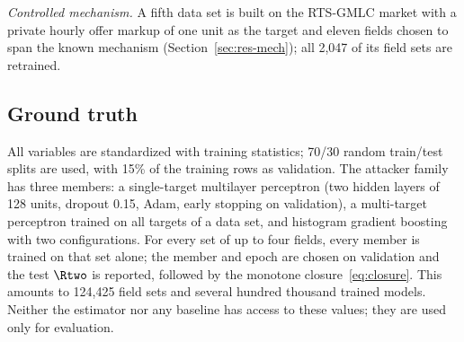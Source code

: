\emph{Controlled mechanism.} A fifth data set is built on the RTS-GMLC market with a private hourly
offer markup of one unit as the target and eleven fields chosen to span the known mechanism
(Section~\ref{sec:res-mech}); all 2,047 of its field sets are retrained.

\begin{table}[!tbp]
\centering\small
\caption{Data sets. $n$: train/test rows; $p$: candidate fields; sets: field sets with exact
three-attacker ground truth.}\label{tab:data}
\end{table}

\subsection{Ground truth}
All variables are standardized with training statistics; 70/30 random train/test splits are
used, with 15\% of the training rows as validation. The attacker family has three members: a
single-target multilayer perceptron (two hidden layers of 128 units, dropout 0.15, Adam,
early stopping on validation), a multi-target perceptron trained on all targets of a data set,
and histogram gradient boosting with two configurations. For every set of up to four fields,
every member is trained on that set alone; the member and epoch are chosen on validation and the
test $\Rtwo$ is reported, followed by the monotone closure~\eqref{eq:closure}. This amounts to
124,425 field sets and several hundred thousand trained models. Neither the
estimator nor any baseline has access to these values; they are used only for evaluation.

